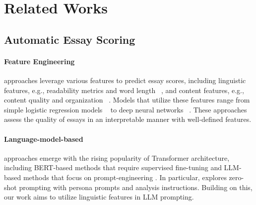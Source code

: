 \section{Related Works}
\label{related-works}
\subsection{Automatic Essay Scoring}
\label{automatic-essay-scoring}

\paragraph{Feature Engineering} approaches leverage various features to predict essay scores, including linguistic features, e.g., readability metrics and word length ~\cite{ridley2020promptagnosticessayscorer, uto-etal-2020-neural, jin-etal-2018-tdnn, FoltLahaLand19993j, chen-he-2013-automated}, and content features, e.g., content quality and organization ~\cite{mathias-bhattacharyya-2018-asap, crossley2023english}. Models that utilize these features range from simple logistic regression models ~\cite{chen-he-2013-automated} to deep neural networks ~\cite{uto-etal-2020-neural}. These approaches assess the quality of essays in an interpretable manner with well-defined features.

\paragraph{Language-model-based} approaches emerge with the rising popularity of Transformer architecture, including BERT-based methods that require supervised fine-tuning \cite{wang-etal-2022-use, mutlitaskAESforEssayGrading, hierarchicalbert} and LLM-based methods that focus on prompt-engineering \cite{mansour-etal-2024-large, stahl-etal-2024-exploring}. In particular, \cite{stahl-etal-2024-exploring} explores zero-shot prompting with persona prompts and analysis instructions. Building on this, our work aims to utilize linguistic features in LLM prompting.

